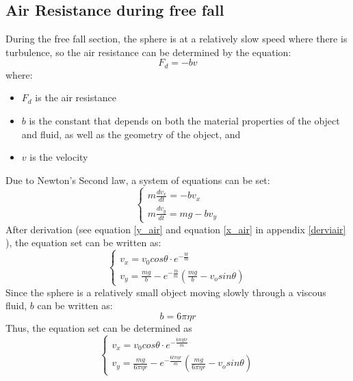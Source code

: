 \documentclass{article}
\begin{document}
        
    \subsection{Air Resistance during free fall}
        During the free fall section, the sphere is at a relatively slow speed where there is turbulence, so the air resistance can be determined by the equation:
        \begin{equation}
            F_d = -bv
        \end{equation}
        where:
        \begin{itemize}
            \item $F_d$ is the air resistance
            \item $b$ is the constant that depends on both the material properties of the object and fluid, as well as the geometry of the object, and
            \item $v$ is the velocity
        \end{itemize}
        Due to Newton's Second law, a system of equations can be set:
        \begin{equation*}
            \begin{cases}
            m\frac{dv_x}{dt} = -bv_x\\
            m\frac{dv_y}{dt} = mg-bv_y
            \end{cases}
        \end{equation*}
        After derivation (see equation \ref{y_air} and equation \ref{x_air} in appendix \ref{derviair} ), the equation set can be written as:
        \begin{equation*}
            \begin{cases}
            v_x = v_0cos\theta\cdot e^{-\frac{bt}{m}}\\
            v_y = \frac{mg}{b} - e^{-\frac{tb}{m}}(\frac{mg}{b}-v_osin\theta)
            \end{cases}
        \end{equation*}
        Since the sphere is a relatively small object moving slowly through a viscous fluid, $b$ can be written as:
        \begin{equation}
            b = 6\pi\eta r \nonumber
        \end{equation}
        Thus, the equation set can be determined as
        \begin{equation}
           \begin{cases}
               v_x = v_0 cos\theta\cdot e^{-\frac{6\pi\eta tr}{m}}\\
               v_y = \frac{mg}{6\pi\eta r} - e^{-\frac{6t\pi\eta r}{m}}(\frac{mg}{6\pi\eta r}-v_osin\theta)
           \end{cases} 
        \end{equation}
\end{document}
